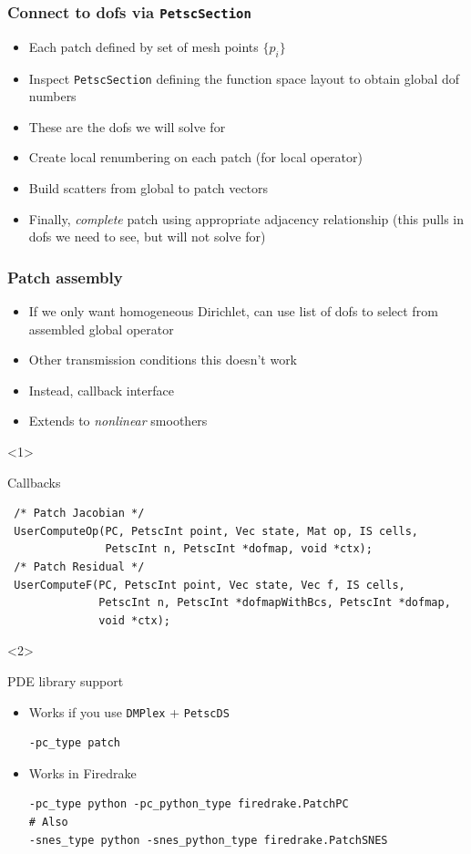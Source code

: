 \documentclass[presentation,aspectratio=43,10pt]{beamer}
\begin{document}
\begin{frame}
  \frametitle{Connect to dofs via \texttt{PetscSection}}
  \begin{itemize}
  \item Each patch defined by set of mesh points $\{p_i\}$
  \item Inspect \texttt{PetscSection} defining the function space
    layout to obtain global dof numbers
  \item These are the dofs we will solve for
  \item Create local renumbering on each patch (for local operator)
  \item Build scatters from global to patch vectors
  \item Finally, \emph{complete} patch using appropriate adjacency
    relationship (this pulls in dofs we need to see, but will not
    solve for)
  \end{itemize}
\end{frame}
\begin{frame}[fragile,t]
  \frametitle{Patch assembly}
  \begin{itemize}
  \item If we only want homogeneous Dirichlet, can use list of dofs to
    select from assembled global operator
  \item Other transmission conditions this doesn't work
  \item Instead, callback interface
  \item Extends to \emph{nonlinear} smoothers
  \end{itemize}

  \begin{onlyenv}<1>
    \begin{block}{Callbacks}
\begin{verbatim}
 /* Patch Jacobian */
 UserComputeOp(PC, PetscInt point, Vec state, Mat op, IS cells, 
               PetscInt n, PetscInt *dofmap, void *ctx);
 /* Patch Residual */
 UserComputeF(PC, PetscInt point, Vec state, Vec f, IS cells, 
              PetscInt n, PetscInt *dofmapWithBcs, PetscInt *dofmap,
              void *ctx);
\end{verbatim}
    \end{block}
  \end{onlyenv}
  \begin{onlyenv}<2>
    \begin{block}{PDE library support}
      \begin{itemize}
      \item Works if you use \texttt{DMPlex} + \texttt{PetscDS}
\begin{verbatim}
-pc_type patch
\end{verbatim}
      \item Works in Firedrake
\begin{verbatim}
-pc_type python -pc_python_type firedrake.PatchPC
# Also
-snes_type python -snes_python_type firedrake.PatchSNES
\end{verbatim}
      \end{itemize}
    \end{block}
  \end{onlyenv}
\end{frame}
\end{document}
